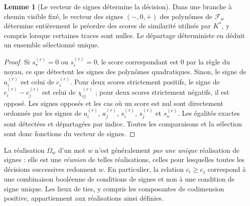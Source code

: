 \documentclass[11pt,a4paper]{article}
\theoremstyle{definition}
\newtheorem{lemma}[definition]{Lemme}
\theoremstyle{remark}
\begin{document}
\begin{lemma}[Le vecteur de signes détermine la décision]
\label{lem:signes-determinent-kstar}
Dans une branche à chemin visible fixé, le vecteur des signes $(-,0,+)$ des polynômes de $\mathscr F_w$ détermine entièrement le préordre des scores de similarité utilisés par $K^*$, y compris lorsque certaines traces sont nulles. Le départage déterministe en déduit un ensemble sélectionné unique.
\end{lemma}
\begin{proof}
Si $s_\star^{(r)}=0$ ou $s_i^{(r)}=0$, le score correspondant est $0$ par la règle du noyau, ce que détectent les signes des polynômes quadratiques. Sinon, le signe de $a_i^{(r)}$ est celui de $c_i^{(r)}$. Pour deux scores strictement positifs, le signe de $c_i^{(r)}-c_j^{(r)}$ est celui de $\chi_{ij}^{(r)}$ ; pour deux scores strictement négatifs, il est opposé. Les signes opposés et les cas où un score est nul sont directement ordonnés par les signes de $a_i^{(r)}$, $a_j^{(r)}$, $s_i^{(r)}$, $s_j^{(r)}$ et $s_\star^{(r)}$. Les égalités exactes sont détectées et départagées par indice. Toutes les comparaisons et la sélection sont donc fonctions du vecteur de signes.
\end{proof}

La réalisation $\Omega_w$ d'un mot $w$ n'est généralement \emph{pas une unique} réalisation de signes : elle est une \emph{réunion} de telles réalisations, celles pour lesquelles toutes les décisions successives redonnent $w$. En particulier, la relation $c_i\ge c_j$ correspond à une combinaison booléenne de conditions de signes et non à une condition de signe unique. Les lieux de ties, y compris les composantes de codimension positive, appartiennent aux réalisations ainsi définies.
\end{document}
